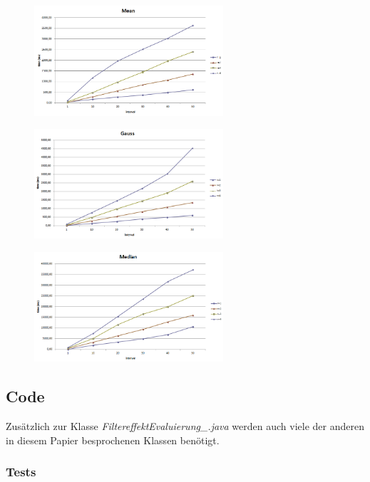 \documentclass[12pt,german]{article}
\begin{document}
\begin{figure}[H]
	\includegraphics[width=7cm]{TimeEvaluationGraph_Mean.png}
\end{figure}
\begin{figure}[H]
	\includegraphics[width=7cm]{TimeEvaluationGraph_Gauss.png}
\end{figure}
\begin{figure}[H]
	\includegraphics[width=7cm]{TimeEvaluationGraph_Median.png}
\end{figure}


\subsection{Code}
Zusätzlich zur Klasse \textit{FiltereffektEvaluierung\_.java} werden auch viele der anderen in diesem Papier besprochenen Klassen benötigt.

\subsubsection{Tests}

\newpage
\end{document}
